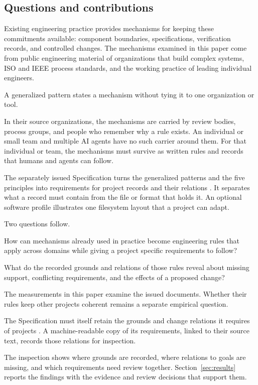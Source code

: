 \subsection{Questions and contributions}

Existing engineering practice provides mechanisms for keeping these commitments available: component boundaries, specifications, verification records, and controlled changes. The mechanisms examined in this paper come from public engineering material of organizations that build complex systems, ISO and IEEE process standards, and the working practice of leading individual engineers.

A generalized pattern states a mechanism without tying it to one organization or tool.

In their source organizations, the mechanisms are carried by review bodies, process groups, and people who remember why a rule exists. An individual or small team and multiple AI agents have no such carrier around them. For that individual or team, the mechanisms must survive as written rules and records that humans and agents can follow.

The separately issued Specification turns the generalized patterns and the five principles into requirements for project records and their relations \citep{pss2026}.
It separates what a record must contain from the file or format that holds it. An optional software profile illustrates one filesystem layout that a project can adapt.

Two questions follow.

How can mechanisms already used in practice become engineering rules that apply across domains while giving a project specific requirements to follow?

What do the recorded grounds and relations of those rules reveal about missing support, conflicting requirements, and the effects of a proposed change?

The measurements in this paper examine the issued documents.
Whether their rules keep other projects coherent remains a separate empirical question.

The Specification must itself retain the grounds and change relations it requires of projects \citep{goal2026}. A machine-readable copy of its requirements, linked to their source text, records those relations for inspection.

The inspection shows where grounds are recorded, where relations to goals are missing, and which requirements need review together.
Section~\ref{sec:results} reports the findings with the evidence and review decisions that support them.

